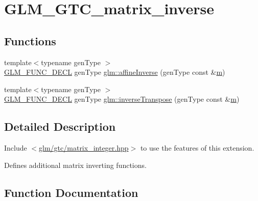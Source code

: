 \hypertarget{group__gtc__matrix__inverse}{}\section{G\+L\+M\+\_\+\+G\+T\+C\+\_\+matrix\+\_\+inverse}
\label{group__gtc__matrix__inverse}
\subsection*{Functions}
\begin{DoxyCompactItemize}
\item 
{\footnotesize template$<$typename gen\+Type $>$ }\\\mbox{\hyperlink{setup_8hpp_ab2d052de21a70539923e9bcbf6e83a51}{G\+L\+M\+\_\+\+F\+U\+N\+C\+\_\+\+D\+E\+CL}} gen\+Type \mbox{\hyperlink{group__gtc__matrix__inverse_gae0fcc5fc8783291f9702272de428fa0e}{glm\+::affine\+Inverse}} (gen\+Type const \&\mbox{\hyperlink{_s_d_l__opengl__glext_8h_af593500c283bf1a787a6f947f503a5c2}{m}})
\item 
{\footnotesize template$<$typename gen\+Type $>$ }\\\mbox{\hyperlink{setup_8hpp_ab2d052de21a70539923e9bcbf6e83a51}{G\+L\+M\+\_\+\+F\+U\+N\+C\+\_\+\+D\+E\+CL}} gen\+Type \mbox{\hyperlink{group__gtc__matrix__inverse_gab213cd0e3ead5f316d583f99d6312008}{glm\+::inverse\+Transpose}} (gen\+Type const \&\mbox{\hyperlink{_s_d_l__opengl__glext_8h_af593500c283bf1a787a6f947f503a5c2}{m}})
\end{DoxyCompactItemize}


\subsection{Detailed Description}
Include $<$\mbox{\hyperlink{matrix__integer_8hpp}{glm/gtc/matrix\+\_\+integer.\+hpp}}$>$ to use the features of this extension.

Defines additional matrix inverting functions. 

\subsection{Function Documentation}
\mbox{\label{group__gtc__matrix__inverse_gae0fcc5fc8783291f9702272de428fa0e}} 
